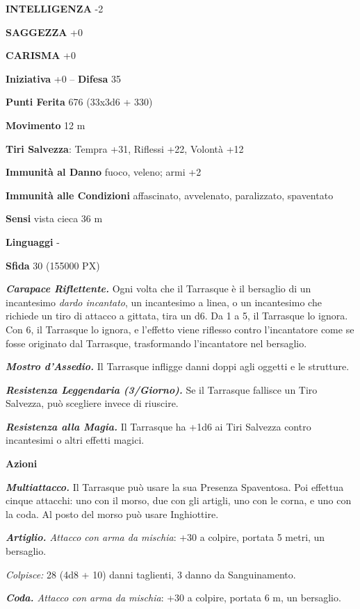 \begin{multicols}{2}
	\textbf{INTELLIGENZA} -2

	\textbf{SAGGEZZA} +0

	\textbf{CARISMA} +0

	\textbf{Iniziativa} +0 -- \textbf{Difesa} 35

	\textbf{Punti Ferita} 676 (33x3d6 + 330)

	\textbf{Movimento} 12 m

	\textbf{Tiri Salvezza}: Tempra +31, Riflessi +22, Volontà +12

	\textbf{Immunità al Danno} fuoco, veleno; armi +2

	\textbf{Immunità alle Condizioni} affascinato, avvelenato, paralizzato, spaventato

	\textbf{Sensi} vista cieca 36 m

	\textbf{Linguaggi} -

	\textbf{Sfida} 30 (155000 PX)

	\textit{\textbf{Carapace Riflettente.}} Ogni volta che il Tarrasque è il bersaglio di un incantesimo \textit{dardo incantato}, un incantesimo a linea, o un incantesimo che richiede un tiro di attacco a gittata, tira un d6. Da 1 a 5, il Tarrasque lo ignora. Con 6, il Tarrasque lo ignora, e l'effetto viene riflesso contro l'incantatore come se fosse originato dal Tarrasque, trasformando l'incantatore nel bersaglio.

	\textit{\textbf{Mostro d'Assedio.}} Il Tarrasque infligge danni doppi agli oggetti e le strutture.

	\textit{\textbf{Resistenza Leggendaria (3/Giorno).}} Se il Tarrasque fallisce un Tiro Salvezza, può scegliere invece di riuscire.

	\textit{\textbf{Resistenza alla Magia.}} Il Tarrasque ha +1d6 ai Tiri Salvezza contro incantesimi o altri effetti magici.

	\textbf{Azioni}

	\textit{\textbf{Multiattacco.}} Il Tarrasque può usare la sua Presenza Spaventosa. Poi effettua cinque attacchi: uno con il morso, due con gli artigli, uno con le corna, e uno con la coda. Al posto del morso può usare Inghiottire.

	\textit{\textbf{Artiglio.} Attacco con arma da mischia}: +30 a colpire, portata 5 metri, un bersaglio.

	\textit{Colpisce:} 28 (4d8 + 10) danni taglienti, 3 danno da Sanguinamento.

	\textit{\textbf{Coda.} Attacco con arma da mischia}: +30 a colpire, portata 6 m, un bersaglio.


\end{multicols}
